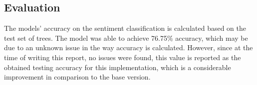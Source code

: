 \documentclass[12pt,a4paper]{article}
\begin{document}
	\vspace{-0.2cm}
	\subsection{Evaluation}
	The models' accuracy on the sentiment classification is calculated based on the test set of trees. The model was able to achieve 76.75\% accuracy, which may be due to an unknown issue in the way accuracy is calculated. However, since at the time of writing this report, no issues were found, this value is reported as the obtained testing accuracy for this implementation, which is a considerable improvement in comparison to the base version.
	
	
	
	
	
\end{document}
